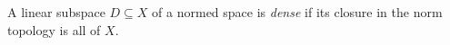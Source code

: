 
A linear subspace $D\subseteq X$ of a normed space is \emph{dense} if its closure in the norm topology is all of $X$.
